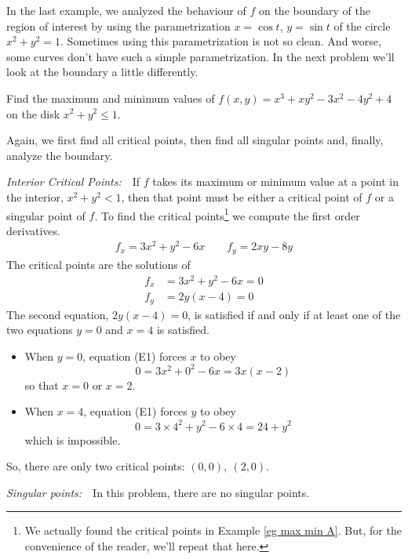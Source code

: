 In the last example, we analyzed the behaviour of $f$ on the boundary
of the region of interest by using the parametrization $x=\cos t$, $y=\sin t$
of the circle $x^2+y^2=1$. Sometimes using this parametrization is not
so clean. And worse, some curves don't have such a simple parametrization.
In the next problem we'll look at the boundary a little differently. 

\begin{eg}\label{eg:MXMNabsB}
Find the maximum and minimum values of $f(x,y)=x^3+xy^2-3x^2-4y^2+4$
on the disk $x^2+y^2\le 1$.

\soln 
Again, we first find all critical points, then find all singular points
and, finally, analyze the boundary.

\noindent\emph{Interior Critical Points:}\ \ 
If $f$ takes its maximum or minimum value at a point in the interior, 
$x^2+y^2<1$, then that point must be either a critical point of $f$ 
or a singular point of $f$.
To find the critical points\footnote{We actually found the critical points in
Example \ref{eg max min A}. But, for the convenience of the reader, we'll repeat that here.} we compute the first order derivatives.
\begin{align*}
f_x=3x^2+y^2-6x \qquad
f_y=2xy-8y 
\end{align*}
The critical points are the solutions of
\begin{align*}
f_x&=3x^2+y^2-6x=0 \tag{E1}\\
f_y&=2y(x-4)=0 \tag{E2}
\end{align*}
The second equation, $2y(x-4)=0 $, is satisfied if and only if at least 
one of the two equations $y=0$ and $x=4$ is satisfied.
\begin{itemize}
\item
When $y=0$, equation (E1) forces $x$ to obey 
\begin{equation*}
0=3x^2+0^2-6x=3x(x-2)
\end{equation*}
so that $x=0$ or $x=2$.
\item
When $x=4$, equation (E1) forces $y$ to obey 
\begin{equation*}
0=3\times 4^2+y^2-6\times 4=24+y^2
\end{equation*} 
which is impossible.
\end{itemize}
So, there are only two critical points: $(0,0),\ (2,0)$.

\smallskip
\noindent\emph{Singular points:}\ \  In this problem, there are no singular 
points.



\end{eg}
